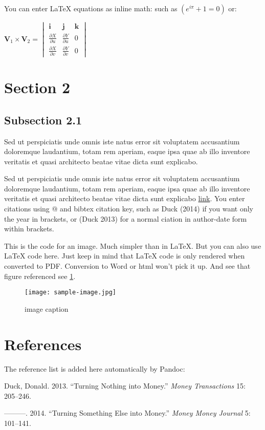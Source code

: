 \documentclass[a4paper,12pt]{article}
\begin{document}
You can enter LaTeX equations as inline math: such as
\(({e}^{i\pi }+1=0)\) or:

\(\mathbf{V}_1 \times \mathbf{V}_2 = \begin{vmatrix} \mathbf{i} & \mathbf{j} & \mathbf{k} \\ \frac{\partial X}{\partial u} & \frac{\partial Y}{\partial u} & 0 \\ \frac{\partial X}{\partial v} & \frac{\partial Y}{\partial v} & 0 \end{vmatrix}\)

\section{Section 2}\label{section-2}

\subsection{Subsection 2.1}\label{subsection-2.1}

Sed ut perspiciatis unde omnis iste natus error sit voluptatem
accusantium doloremque laudantium, totam rem aperiam, eaque ipsa quae ab
illo inventore veritatis et quasi architecto beatae vitae dicta sunt
explicabo.

Sed ut perspiciatis unde omnis iste natus error sit voluptatem
accusantium doloremque laudantium, totam rem aperiam, eaque ipsa quae ab
illo inventore veritatis et quasi architecto beatae vitae dicta sunt
explicabo \href{http://www.http://daringfireball.net}{link}. You enter
citations using @ and bibtex citation key, such as Duck (2014) if you
want only the year in brackets, or (Duck 2013) for a normal ciation in
author-date form within brackets.

This is the code for an image. Much simpler than in LaTeX. But you can
also use LaTeX code here. Just keep in mind that LaTeX code is only
rendered when converted to PDF. Conversion to Word or html won't pick it
up. And see that figure referenced see \ref{fig:mylabel}.

\begin{figure}[htbp]
\centering
\texttt{[image: sample-image.jpg]}
\caption{image \label{fig:mylabel} caption}
\end{figure}

\section{References}\label{references}

The reference list is added here automatically by Pandoc:

Duck, Donald. 2013. ``Turning Nothing into Money.'' \emph{Money
Transactions} 15: 205--246.

---------. 2014. ``Turning Something Else into Money.'' \emph{Money
Money Journal} 5: 101--141.
\end{document}
